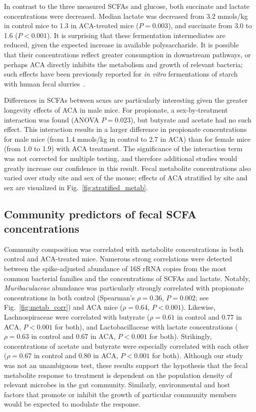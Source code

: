 \documentclass{doc/template/bmcart-nofigbox}
\newcommand{\frnlang}[1]{\textit{#1}}
\newcommand{\taxon}[1]{\frnlang{#1}}
\begin{document}
In contrast to the three measured SCFAs and glucose,
both succinate and lactate concentrations were decreased.
Median lactate was decreased from 3.2 mmols/kg in control mice to 1.3 in
ACA-treated mice ($P = 0.003$),
and succinate from 3.0 to 1.6 ($P < 0.001$).
It is surprising that these fermentation intermediates are reduced, given
the expected increase in available polysaccharide.
It is possible that their concentrations reflect greater consumption
in downstream pathways, or
perhaps ACA directly inhibits the metabolism and growth of relevant bacteria;
such effects have been previously reported for \frnlang{in vitro} fermentations of
starch with human fecal slurries~\cite{Weaver1997}.

Differences in SCFAs between sexes are particularly interesting given
the greater longevity effects of ACA in male mice.
For propionate, a sex-by-treatment interaction was found (ANOVA $P = 0.023$),
but butyrate and acetate had no such effect.
This interaction results in a larger difference in propionate concentrations
for male mice (from 1.4 mmols/kg in control to 2.7 in ACA) than for female mice
(from 1.0 to 1.9) with ACA treatment.
The significance of the interaction term was not corrected for
multiple testing, and therefore additional studies would greatly increase our
confidence in this result.
Fecal metabolite concentrations also varied over study site and sex of the
mouse;
effects of ACA stratified by site and sex are visualized in Fig.~\ref{fig:stratified_metab}.

\subsection*{Community predictors of fecal SCFA concentrations}

Community composition was correlated with metabolite concentrations
in both control and ACA-treated mice.
Numerous strong correlations were detected between the
spike-adjusted abundance of 16S rRNA copies from the most common bacterial
families and the concentrations of SCFAs and lactate.
Notably,
\taxon{Muribaculaceae} abundance was particularly strongly correlated with
propionate concentrations in both control
(Spearman's $\rho = 0.36$, $P = 0.002$; see Fig.~\ref{fig:metab_corr})
and ACA mice ($\rho = 0.64$, $P < 0.001$).
Likewise, Lachnospiraceae were correlated with butyrate ($\rho = 0.61$ in control
and $0.77$ in ACA, $P < 0.001$ for both),
and Lactobacillaceae with lactate concentrations ($\rho = 0.63$ in control
and $0.67$ in ACA, $P < 0.001$ for both).
Strikingly, concentrations of acetate and butyrate were especially correlated
with each other
($\rho = 0.67$ in control and $0.80$ in ACA, $P < 0.001$ for both).
Although our study was not an unambiguous test, these results
support the hypothesis that the fecal metabolite response to treatment is
dependent on the population density of relevant microbes in the gut community.
Similarly, environmental and host factors that promote or inhibit the growth
of particular community members would be expected to modulate the response.
\end{document}
